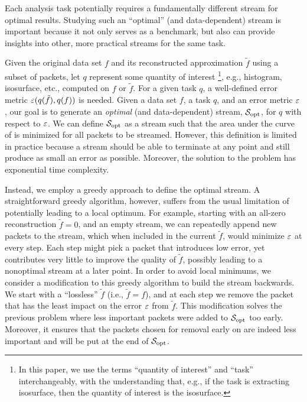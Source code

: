 Each analysis task potentially requires a fundamentally different stream for optimal results.
Studying such an ``optimal'' (and data-dependent) stream is important because it not only serves as
a benchmark, but also can provide insights into other, more practical streams for the same task.

Given the original data set $f$ and its reconstructed approximation $\tilde{f}$ using a subset of
packets, let $q$ represent some quantity of interest \footnote{In this paper, we use the terms
``quantity of interest'' and ``task'' interchangeably, with the understanding that, e.g., if the
task is extracting isosurface, then the quantity of interest is the isosurface.}, e.g., histogram,
isosurface, etc., computed on $f$ or $\tilde{f}$. For a given task $q$, a well-defined error metric
$\err(q(\tilde{f}),q(f))$ is needed. Given a data set $f$, a task $q$, and an error metric $\err$,
our goal is to generate an \emph{optimal} (and data-dependent) stream, $\sopt$, for $q$ with respect
to $\err$. We can define $\sopt$ as a stream such that the area under the curve of \err is minimized
for all packets to be streamed. However, this definition is limited in practice because a stream
should be able to terminate at any point and still produce as small an error as possible. Moreover,
the solution to the problem has exponential time complexity.

Instead, we employ a greedy approach to define the optimal stream.  A straightforward greedy
algorithm, however, suffers from the usual limitation of potentially leading to a local optimum. For
example, starting with an all-zero reconstruction $\tilde{f}=0$, and an empty stream, we can
repeatedly append new packets to the stream, which when included in the current $\tilde{f}$, would
minimize $\err$ at every step. Each step might pick a packet that introduces low error, yet
contributes very little to improve the quality of $\tilde{f}$, possibly leading to a nonoptimal
stream at a later point. In order to avoid local minimums, we consider a modification to this greedy
algorithm to build the stream backwards. We start with a ``lossless'' $\tilde{f}$ (i.e.,
$\tilde{f}=f$), and at each step we remove the packet that has the least impact on the error $\err$
from $\tilde{f}$. This modification solves the previous problem where less important packets were
added to $\sopt$ too early. Moreover, it ensures that the packets chosen for removal early on are
indeed less important and will be put at the end of $\sopt$.


